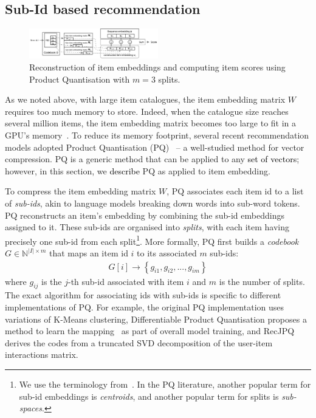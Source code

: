 \documentclass[sigconf,natbib=true, review=true]{acmart} %
\newcommand{\pageenlarge}[1]{\marginnote{}\enlargethispage{#1\baselineskip}}
\newcommand{\sasha}[1]{\textcolor[HTML]{000000}{#1}}
\newcommand{\nt}[1]{\textcolor{black}{#1}}
\begin{document}
\subsection{Sub-Id based recommendation}\label{ssec:recjpq}


\begin{figure}[tb]\hspace{-3mm}
    \vspace{-0.5\baselineskip}
\includegraphics[width=0.5\textwidth]{figures/pq_scoring_graffle.pdf}%
    \caption{Reconstruction of item embeddings \sasha{and computing item scores} using Product Quantisation \sasha{with $m=3$ splits.} }\vspace{-.75\baselineskip}
    \label{fig:embedding_reconstruction}
\end{figure}


As we noted above, with large item catalogues, the item embedding matrix $W$ requires too much memory to store. Indeed, when the catalogue size reaches several million items, the item embedding matrix becomes too large to fit in a GPU's memory~\cite{petrovRecJPQTrainingLargeCatalogue2024}. To reduce its memory footprint, several recent recommendation models adopted Product Quantisation (PQ)~\cite{jegouProductQuantizationNearest2011} -- a well-studied method for vector compression. PQ is a generic method that can be applied to any \nt{set of vectors}; however, in this section, we \nt{describe} PQ as applied to item embedding. 

 To compress the item embedding matrix $W$, PQ associates each item id to a list of {\em sub-ids}, akin to language models breaking down words into sub-word tokens. PQ reconstructs an item's embedding by combining the sub-id embeddings assigned to it. These sub-ids are organised into {\em splits}, with each item having precisely one sub-id from each split\footnote{We use the terminology from~\cite{petrovRecJPQTrainingLargeCatalogue2024}. In the PQ literature, another popular term for sub-id embeddings is \emph{centroids}, and another popular term for splits is \emph{sub-spaces}.}. More formally, PQ first builds a \emph{codebook} $G\in\mathbb{N}^{|I|\times m}$ that maps an item id $i$ to its associated $m$ sub-ids:
\begin{align}
    G[i] \rightarrow \left\{g_{i1}, g_{i2}, ..., g_{im}\right\} \label{eq:sub_ids_map}
\end{align}
where $g_{ij}$ is the $j$-th sub-id associated with item $i$ and $m$ is the number of splits.
The exact algorithm for associating ids with sub-ids is specific to different implementations of PQ. For example, the original PQ implementation uses variations of K-Means clustering, Differentiable Product Quantisation proposes a method to learn the mapping~\cite{chenDifferentiableProductQuantization2020} as part of overall model training, and RecJPQ~\cite{petrovRecJPQTrainingLargeCatalogue2024} derives the codes from a truncated SVD decomposition of the user-item interactions matrix. 
\end{document}
